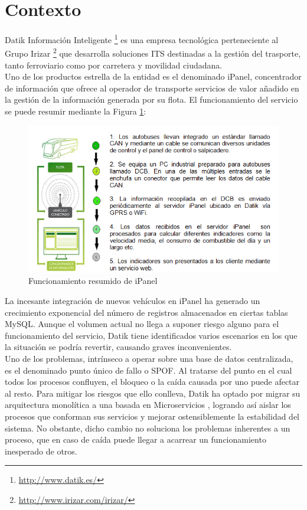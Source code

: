 \section{Contexto}
 
Datik Información Inteligente \footnote{\url{http://www.datik.es/}} es una empresa tecnológica perteneciente al Grupo Irizar \footnote{\url{http://www.irizar.com/irizar/}}  que desarrolla soluciones ITS destinadas a la gestión del trasporte, tanto ferroviario como por carretera y movilidad ciudadana.\\

Uno de los productos estrella de la entidad es el denominado iPanel, concentrador de  información que ofrece al operador de transporte servicios de valor añadido en la gestión de la información generada por su flota. El funcionamiento del servicio se puede resumir mediante la Figura \ref{fig:ipanel}:\\

\begin{figure}[h]
	\centering
	\includegraphics[width=1\textwidth]{Ilustraciones/ipanel_infraesctructure.png}
	\caption{Funcionamiento resumido de iPanel}
	\label{fig:ipanel}
\end{figure}

La incesante integración de nuevos vehículos en iPanel ha generado un crecimiento exponencial del número de registros almacenados en ciertas tablas MySQL. Aunque el volumen actual no llega a suponer riesgo alguno para el funcionamiento del servicio, Datik tiene identificados varios escenarios en los que la situación se podría revertir, causando graves inconvenientes.\\

Uno de los problemas, intrínseco a operar sobre una base de datos centralizada, es el denominado punto único de fallo o SPOF. Al tratarse del punto en el cual todos los procesos confluyen, el bloqueo o la caída causada por uno puede afectar al resto. Para mitigar los riesgos que ello conlleva, Datik ha optado por migrar su arquitectura monolítica a una basada en Microservicios \cite{newman2015building}, logrando así aislar los procesos que conforman sus servicios y mejorar ostensiblemente la estabilidad del sistema. No obstante, dicho cambio no soluciona los problemas inherentes a un proceso, que en caso de caída puede llegar a acarrear un funcionamiento inesperado de otros.\\ 

